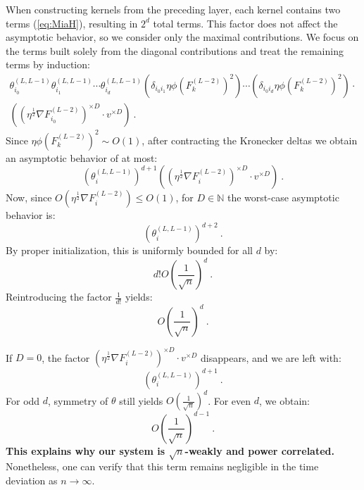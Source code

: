 \documentclass{article} %
\begin{document}
When constructing kernels from the preceding layer, each kernel contains two terms (\ref{eq:MiaH}), resulting in \(2^d\) total terms. This factor does not affect the asymptotic behavior, so we consider only the maximal contributions. We focus on the terms built solely from the diagonal contributions and treat the remaining terms by induction:
\begin{equation}
\begin{array}{c}
\theta_{i_{0}}^{\left(L,L-1\right)}\theta_{i_{1}}^{\left(L,L-1\right)}\cdots\theta_{i_{d}}^{\left(L,L-1\right)}\left(\delta_{i_{0}i_{1}}\eta\phi\left(F_{k}^{\left(L-2\right)}\right)^{2}\right)\cdots\left(\delta_{i_{0}i_{d}}\eta\phi\left(F_{k}^{\left(L-2\right)}\right)^{2}\right)\cdot\\
\left(\left(\eta^{\frac{1}{2}}\nabla F_{i_{0}}^{\left(L-2\right)}\right)^{\times D}\cdot v^{\times D}\right) \ .
\end{array}
\end{equation}
Since \(\eta\phi\left(F_{k}^{\left(L-2\right)}\right)^{2}\sim O(1)\), after contracting the Kronecker deltas we obtain an asymptotic behavior of at most:
\begin{equation}
\left(\theta_{i}^{\left(L,L-1\right)}\right)^{d+1}\left(\left(\eta^{\frac{1}{2}}\nabla F_{i}^{\left(L-2\right)}\right)^{\times D}\cdot v^{\times D}\right) \ .
\end{equation}
Now, since \(O\left(\eta^{\frac{1}{2}}\nabla F_{i}^{\left(L-2\right)}\right)\leq O\left(1\right)\), for \(D\in\mathbb{N}\) the worst-case asymptotic behavior is:
\begin{equation}
\left(\theta_{i}^{\left(L,L-1\right)}\right)^{d+2} \ .
\end{equation}
By proper initialization, this is uniformly bounded for all \(d\) by:
\begin{equation}
d!O\left(\frac{1}{\sqrt{n}}\right)^{d} \ .
\end{equation}
Reintroducing the factor \(\frac{1}{d!}\) yields:
\begin{equation}
O\left(\frac{1}{\sqrt{n}}\right)^{d} \ .
\end{equation}

If \(D=0\), the factor \(\left(\eta^{\frac{1}{2}}\nabla F_{i}^{\left(L-2\right)}\right)^{\times D}\cdot v^{\times D}\) disappears, and we are left with:
\begin{equation}
\left(\theta_{i}^{\left(L,L-1\right)}\right)^{d+1} \ .
\end{equation}
For odd \(d\), symmetry of \(\theta\) still yields \(O\left(\frac{1}{\sqrt{n}}\right)^{d}\). For even \(d\), we obtain:
\begin{equation}
O\left(\frac{1}{\sqrt{n}}\right)^{d-1} \ .
\end{equation}
\textbf{This explains why our system is \(\sqrt{n}\)-weakly and power correlated.} Nonetheless, one can verify that this term remains negligible in the time deviation as \(n\rightarrow\infty\).
\end{document}

